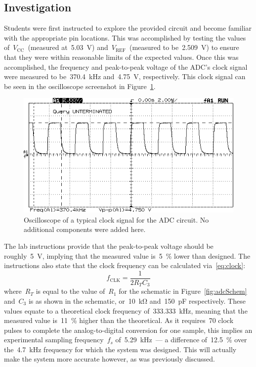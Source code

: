 \subsection{Investigation}
Students were first instructed to explore the provided circuit and become familiar with the appropriate pin locations.  This was accomplished by testing the values of~$V_\text{CC}$~(measured at~\SI{5.03}{\volt}) and~$V_\text{REF}$~(measured to be~\SI{2.509}{\volt}) to ensure that they were within reasonable limits of the expected values.  Once this was accomplished, the frequency and peak-to-peak voltage of the ADC's clock signal were measured to be~\SI{370.4}{\kilo\hertz} and~\SI{4.75}{\volt}, respectively.  This clock signal can be seen in the oscilloscope screenshot in Figure~\ref{fig:normalClock}.
%
\begin{figure}[H]
	\centering
	\includegraphics[width=.6\textwidth]{img/shot/part2shot.png}
	\parbox{.6\textwidth}{
	\caption[Typical ADC clock signal]{Oscilloscope of a typical clock signal
	for the ADC circuit.  No additional components were added here.}
	\label{fig:normalClock}}
\end{figure}
%
The lab instructions provide that the peak-to-peak voltage should be roughly~\SI{5}{\volt}, implying that the measured value is~\SI{5}{\percent} lower than designed. The instructions also state that the clock frequency can be calculated via~\eqref{eq:clock}:
%
\begin{equation}
	f_\text{CLK} = \frac{1}{2 R_T C_3} \label{eq:clock}
\end{equation}
%
where~$R_T$ is equal to the value of~$R_1$ for the schematic in Figure~\ref{fig:adcSchem} and~$C_3$ is as shown in the schematic, or~\SI{10}{\kilo\ohm} and~\SI{150}{\pico\farad} respectively.  These values equate to a theoretical clock frequency of~\SI{333.333}{\kilo\hertz}, meaning that the measured value is~\SI{11}{\percent} higher than the theoretical.  As it requires~70 clock pulses to complete the analog-to-digital conversion for one sample, this implies an experimental sampling frequency~$f_s$ of~\SI{5.29}{\kilo\hertz}~--- a difference of~\SI{12.5}{\percent} over the~\SI{4.7}{\kilo\hertz} frequency for which the system was designed.  This will actually make the system more accurate however, as was previously discussed.
